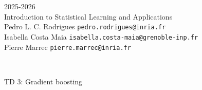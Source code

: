 \begin{flushleft}
 \hfill {} 2025-2026 \\
Introduction to Statistical Learning and Applications \\
Pedro L. C. Rodrigues   \hfill  \texttt{pedro.rodrigues@inria.fr} \\
Isabella Costa Maia \hfill \texttt{isabella.costa-maia@grenoble-inp.fr} \\
Pierre Marrec \hfill \texttt{pierre.marrec@inria.fr}

\HRuleTop\\
\begin{center}
\Large{TD 3: Gradient boosting}
\end{center}
\HRuleBottom
\end{flushleft}

